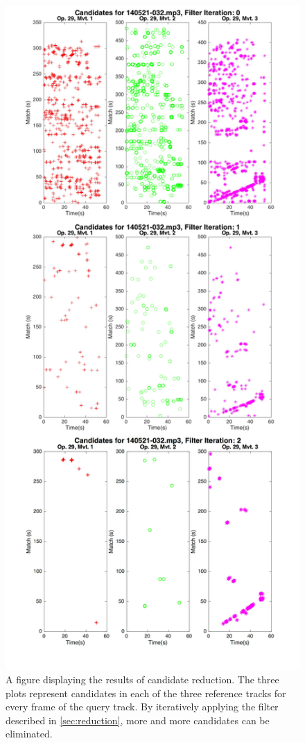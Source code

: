 \documentclass{article}
\begin{document}
\begin{figure}[ht!]
\includegraphics[width=\linewidth]{figs/Stepwise.jpg}
\caption{A figure displaying the results of candidate reduction. The three plots represent candidates in each of the three reference tracks for every frame of the query track. By iteratively applying the filter described in \ref{sec:reduction}, more and more candidates can be eliminated.}
\label{fig:reduction}
\end{figure}
\end{document}
